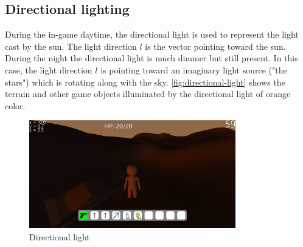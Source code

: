 \subsection{Directional lighting} \label{subsec:directional-lighting}
During the in-game daytime, the directional light is used to represent the light cast by the sun.
The light direction $l$ is the vector pointing toward the sun.
During the night the directional light is much dimmer but still present.
In this case, the light direction $l$ is pointing toward an imaginary light source ("the stars") which is rotating along with the sky.
\autoref{fig:directional-light} shows the terrain and other game objects illuminated by the directional light of orange color.
\begin{figure}[h]
    \centering
    \includegraphics[width=0.8\textwidth]{chapters/lighting/sections/lighting/resources/directional-light.png}
    \caption{Directional light}
    \label{fig:directional-light}
\end{figure}
